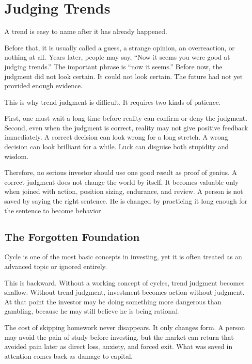 \chapter{Judging Trends}

A trend is easy to name after it has already happened.

Before that, it is usually called a guess, a strange opinion, an overreaction, or nothing at all. Years later, people may say, ``Now it seems you were good at judging trends.'' The important phrase is ``now it seems.'' Before now, the judgment did not look certain. It could not look certain. The future had not yet provided enough evidence.

This is why trend judgment is difficult. It requires two kinds of patience.

First, one must wait a long time before reality can confirm or deny the judgment. Second, even when the judgment is correct, reality may not give positive feedback immediately. A correct decision can look wrong for a long stretch. A wrong decision can look brilliant for a while. Luck can disguise both stupidity and wisdom.

Therefore, no serious investor should use one good result as proof of genius. A correct judgment does not change the world by itself. It becomes valuable only when joined with action, position sizing, endurance, and review. A person is not saved by saying the right sentence. He is changed by practicing it long enough for the sentence to become behavior.

\section*{The Forgotten Foundation}

Cycle is one of the most basic concepts in investing, yet it is often treated as an advanced topic or ignored entirely.

This is backward. Without a working concept of cycles, trend judgment becomes shallow. Without trend judgment, investment becomes action without judgment. At that point the investor may be doing something more dangerous than gambling, because he may still believe he is being rational.

The cost of skipping homework never disappears. It only changes form. A person may avoid the pain of study before investing, but the market can return that avoided pain later as direct loss, anxiety, and forced exit. What was saved in attention comes back as damage to capital.

